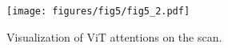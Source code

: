 \begin{figure}[t]
    \centering
    \texttt{[image: figures/fig5/fig5\_2.pdf]}
    \caption{Visualization of ViT attentions on the scan.}
    \label{fig:attention_interpretation}
\end{figure}
